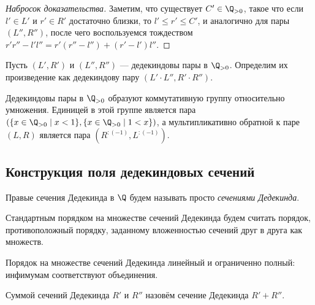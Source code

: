 \documentclass[
	extrafontsizes,
	11pt,
	hyphens,
]{memoir}
\begin{document}
\begin{proof}[Набросок доказательства]
Заметим, что существует \(C' \in \Q_{>0}\), такое что если \(l' \in L'\) и \(r' \in R'\) достаточно близки, то \(l' \leq r' \leq C'\), и аналогично для пары \((L'',R'')\),
после чего воспользуемся тождеством
\(
r' r'' - l' l'' =
r' (r'' - l'') +
(r' - l') l''
\).
\end{proof}

\begin{definition}
Пусть \((L',R')\) и \((L'',R'')\) --- дедекиндовы пары в \(\Q_{>0}\).
Определим их произведение как дедекиндову пару
\((L' \cdot L'', R' \cdot R'')\).
\end{definition}

\begin{observation}
\label{obs:DedPairMultGr}
Дедекиндовы пары в \(\Q_{>0}\) образуют коммутативную группу относительно умножения.
Единицей в этой группе является пара
\((\{x \in \Q_{>0} \mid x < 1\}, \{x \in \Q_{>0} \mid 1 < x\})\),
а мультипликативно обратной к паре \((L,R)\) является пара \((R^{:(-1)}, L^{:(-1)})\).
\end{observation}

\subsection{Конструкция поля дедекиндовых сечений}

\begin{definition}
Правые сечения Дедекинда в \(\Q\) будем называть просто \emph{сечениями Дедекинда}.
\end{definition}

\begin{definition}
Стандартным порядком на множестве сечений Дедекинда будем считать порядок, противоположный порядку, заданному вложенностью сечений друг в друга как множеств.
\end{definition}

\begin{observation}
Порядок на множестве сечений Дедекинда линейный и ограниченно полный: инфимумам соответствуют объединения.
\end{observation}

\begin{definition}
Суммой сечений Дедекинда \(R'\) и \(R''\) назовём сечение Дедекинда \(R' + R''\).
\end{definition}
\end{document}
